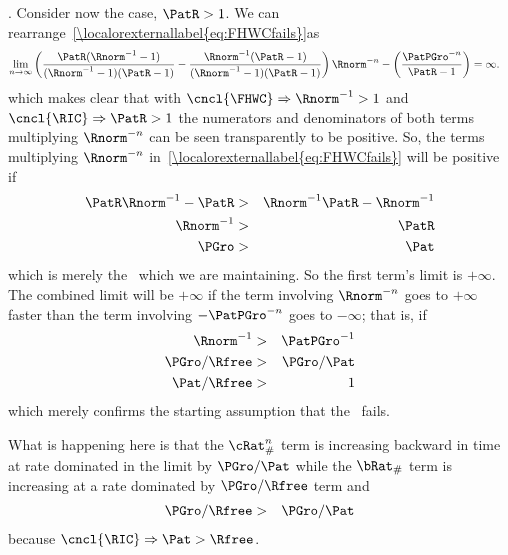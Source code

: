 \documentclass[\econtexRoot/BufferStockTheory]{subfiles}
\begin{document}
.  Consider now the \cncl{\RIC} case, $\PatR > 1$.  We can rearrange~\eqref{\localorexternallabel{eq:FHWCfails}}as
\begin{eqnarray}
  \lim_{n \rightarrow \infty} \left(\frac{\PatR(\Rnorm^{-1}-1)}{(\Rnorm^{-1}-1)(\PatR-1)}-\frac{\Rnorm^{-1}(\PatR-1)}{(\Rnorm^{-1}-1)(\PatR-1)}\right)\Rnorm^{-n}-\left(\frac{\PatPGro^{-n}}{\PatR-1}\right)  & = \infty.  
\end{eqnarray}
which makes clear that with $\cncl{\FHWC} \Rightarrow \Rnorm^{-1} > 1$ and $\cncl{\RIC} \Rightarrow \PatR > 1$ the numerators and denominators of both terms multiplying $\Rnorm^{-n}$ can be seen transparently to be positive.  So, the terms multiplying
$\Rnorm^{-n}$ in~\eqref{\localorexternallabel{eq:FHWCfails}} will be positive if
\begin{eqnarray*}
  \PatR \Rnorm^{-1} - \PatR  & > & \Rnorm^{-1}\PatR-\Rnorm^{-1}
  \\ \Rnorm^{-1}  & > & \PatR
  \\ \PGro  & > & \Pat
\end{eqnarray*}
which is merely the \GICRaw~which we are maintaining.  So the first term's limit is $+\infty$.  The
combined limit will be $+\infty$ if the term involving $\Rnorm^{-n}$
goes to $+\infty$ faster than the term involving $-\PatPGro^{-n}$ goes to
$-\infty$; that is, if
\begin{eqnarray*}
  \Rnorm^{-1}  & > & \PatPGro^{-1}
  \\ \PGro/\Rfree  & > & \PGro/\Pat
  \\ \Pat/\Rfree  & > & 1
\end{eqnarray*}
which merely confirms the starting assumption that the \RIC~fails.

What is happening here is that the $\cRat_{\#}^{n}$ term is increasing backward in time at rate dominated in the limit by $\PGro/\Pat$ while the $\bRat_{\#}$ term is increasing at a rate dominated by $\PGro/\Rfree$ term and
\begin{eqnarray}
  \PGro/\Rfree & > & \PGro/\Pat 
\end{eqnarray}
because $\cncl{\RIC} \Rightarrow \Pat > \Rfree$.
\end{document}
